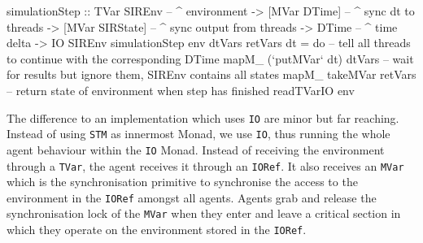 \begin{HaskellCode}
simulationStep :: TVar SIREnv     -- ^ environment 
               -> [MVar DTime]    -- ^ sync dt to threads
               -> [MVar SIRState] -- ^ sync output from threads
               -> DTime           -- ^ time delta
               -> IO SIREnv
simulationStep env dtVars retVars dt = do
  -- tell all threads to continue with the corresponding DTime
  mapM_ (`putMVar` dt) dtVars
  -- wait for results but ignore them, SIREnv contains all states
  mapM_ takeMVar retVars
  -- return state of environment when step has finished
  readTVarIO env
\end{HaskellCode}

The difference to an implementation which uses \texttt{IO} are minor but far reaching. Instead of using \texttt{STM} as innermost Monad, we use \texttt{IO}, thus running the whole agent behaviour within the \texttt{IO} Monad. Instead of receiving the environment through a \texttt{TVar}, the agent receives it through an \texttt{IORef}. It also receives an \texttt{MVar} which is the synchronisation primitive to synchronise the access to the environment in the \texttt{IORef} amongst all agents. Agents grab and release the synchronisation lock of the \texttt{MVar} when they enter and leave a critical section in which they operate on the environment stored in the \texttt{IORef}.